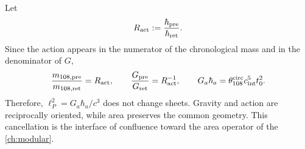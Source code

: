 Let
\begin{equation}
\label{eq:gravity-Ract}
R_{\rm act}:=\frac{\hbar_{\rm pre}}{\hbar_{\rm ret}}.
\end{equation}
Since the action appears in the numerator of the chronological mass and in the
denominator of \(G\),
\begin{equation}
\label{eq:gravity-twoway-covariance}
\frac{m_{108,\rm pre}}{m_{108,\rm ret}}=R_{\rm act},
\qquad
\frac{G_{\rm pre}}{G_{\rm ret}}=R_{\rm act}^{-1},
\qquad
G_a\hbar_a
=\theta_{108}^{\rm circ}c_{\rm int}^5t_0^2.
\end{equation}
Therefore, \(\ell_P^2=G_a\hbar_a/c^3\) does not change sheets. Gravity and
action are reciprocally oriented, while area preserves the
common geometry. This cancellation is the interface of confluence toward the area
operator of the \cref{ch:modular}.
